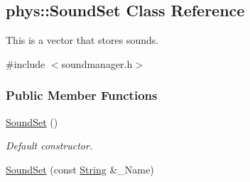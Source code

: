 \hypertarget{classphys_1_1SoundSet}{
\subsection{phys::SoundSet Class Reference}
\label{da/ddd/classphys_1_1SoundSet}
}


This is a vector that stores sounds.  




{\ttfamily \#include $<$soundmanager.h$>$}

\subsubsection*{Public Member Functions}
\begin{DoxyCompactItemize}
\item 
\hypertarget{classphys_1_1SoundSet_a87c99d3ef6cda1b6183edc3320636abb}{
\hyperlink{classphys_1_1SoundSet_a87c99d3ef6cda1b6183edc3320636abb}{SoundSet} ()}
\label{da/ddd/classphys_1_1SoundSet_a87c99d3ef6cda1b6183edc3320636abb}

\begin{DoxyCompactList}\small\item\em Default constructor. \item\end{DoxyCompactList}\item 
\hypertarget{classphys_1_1SoundSet_a3237068484b781ed267cc41050cd6628}{
\hyperlink{classphys_1_1SoundSet_a3237068484b781ed267cc41050cd6628}{SoundSet} (const \hyperlink{namespacephys_aa03900411993de7fbfec4789bc1d392e}{String} \&\_\-Name)}
\label{da/ddd/classphys_1_1SoundSet_a3237068484b781ed267cc41050cd6628}


\end{DoxyCompactItemize}
